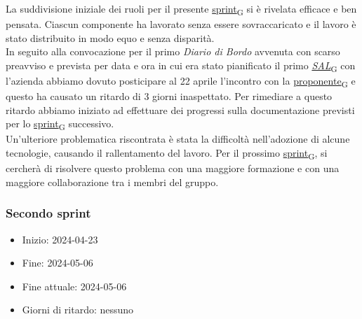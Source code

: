 La suddivisione iniziale dei ruoli per il presente \href{https://7last.github.io/docs/rtb/documentazione-interna/glossario\#sprint}{sprint\textsubscript{G}} si è rivelata efficace e ben pensata. Ciascun componente ha lavorato senza essere sovraccaricato e il lavoro è stato distribuito in modo equo e senza disparità. \\
In seguito alla convocazione per il primo \textit{Diario di Bordo} avvenuta con scarso preavviso e prevista per data e ora in cui era stato pianificato il primo \href{https://7last.github.io/docs/rtb/documentazione-interna/glossario\#stato-avanzamento-lavori}{\textit{SAL}\textsubscript{G}} con l'azienda abbiamo dovuto posticipare al 22 aprile l'incontro con la \href{https://7last.github.io/docs/rtb/documentazione-interna/glossario\#proponente}{proponente\textsubscript{G}} e questo ha causato un ritardo di 3 giorni inaspettato. Per rimediare a questo ritardo abbiamo iniziato ad effettuare dei progressi sulla documentazione previsti per lo \href{https://7last.github.io/docs/rtb/documentazione-interna/glossario\#sprint}{sprint\textsubscript{G}} successivo. \\
Un'ulteriore problematica riscontrata è stata la difficoltà nell'adozione di alcune tecnologie, causando il rallentamento del lavoro. Per il prossimo \href{https://7last.github.io/docs/rtb/documentazione-interna/glossario\#sprint}{sprint\textsubscript{G}}, si cercherà di risolvere questo problema con una maggiore formazione e con una maggiore collaborazione tra i membri del gruppo.



\newpage
\subsubsection{Secondo sprint}
\begin{itemize}
	\item Inizio: 2024-04-23
	\item Fine: 2024-05-06
	\item Fine attuale: 2024-05-06
	\item Giorni di ritardo: nessuno
\end{itemize}

